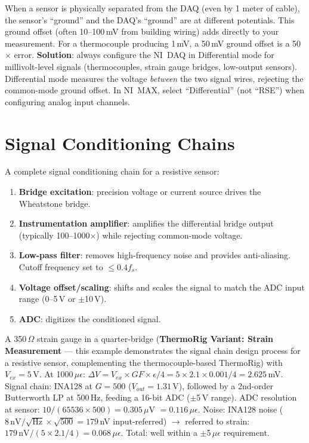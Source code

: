 \documentclass[11pt,letterpaper,twoside,openany]{book}
\begin{document}
\begin{warningbox}
When a sensor is physically separated from the DAQ (even by 1 meter of cable), the sensor's ``ground'' and the DAQ's ``ground'' are at different potentials. This ground offset (often 10--100\,mV from building wiring) adds directly to your measurement. For a thermocouple producing 1\,mV, a 50\,mV ground offset is a 50$\times$ error. \textbf{Solution}: always configure the NI~DAQ in Differential mode for millivolt-level signals (thermocouples, strain gauge bridges, low-output sensors). Differential mode measures the voltage \emph{between} the two signal wires, rejecting the common-mode ground offset. In NI~MAX, select ``Differential'' (not ``RSE'') when configuring analog input channels.
\end{warningbox}

\section{Signal Conditioning Chains}
A complete signal conditioning chain for a resistive sensor:

\begin{enumerate}[leftmargin=1.5em]
\item \textbf{Bridge excitation}: precision voltage or current source drives the Wheatstone bridge.
\item \textbf{Instrumentation amplifier}: amplifies the differential bridge output (typically 100--1000$\times$) while rejecting common-mode voltage.
\item \textbf{Low-pass filter}: removes high-frequency noise and provides anti-aliasing. Cutoff frequency set to $\leq 0.4 f_s$.
\item \textbf{Voltage offset/scaling}: shifts and scales the signal to match the ADC input range (0--5\,V or $\pm$10\,V).
\item \textbf{ADC}: digitizes the conditioned signal.
\end{enumerate}

\begin{examplebox}
A 350\,$\Omega$ strain gauge in a quarter-bridge (\textbf{ThermoRig Variant: Strain Measurement} --- this example demonstrates the signal chain design process for a resistive sensor, complementing the thermocouple-based ThermoRig) with $V_{ex} = 5$\,V. At 1000\,$\mu\epsilon$: $\Delta V = V_{ex} \times GF \times \epsilon / 4 = 5 \times 2.1 \times 0.001 / 4 = 2.625$\,mV. Signal chain: INA128 at $G = 500$ ($V_{out} = 1.31$\,V), followed by a 2nd-order Butterworth LP at 500\,Hz, feeding a 16-bit ADC ($\pm$5\,V range). ADC resolution at sensor: $10/(65536 \times 500) = 0.305\,\mu$V $= 0.116\,\mu\epsilon$. Noise: INA128 noise ($8\,\text{nV}/\sqrt{\text{Hz}} \times \sqrt{500} = 179$\,nV input-referred) $\to$ referred to strain: $179\,\text{nV} / (5 \times 2.1 / 4) = 0.068\,\mu\epsilon$. Total: well within a $\pm$5\,$\mu\epsilon$ requirement.
\end{examplebox}
\end{document}

